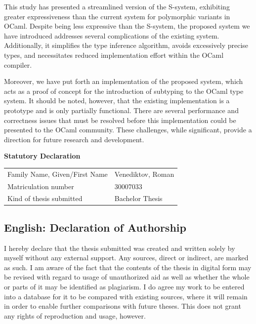 \documentclass[a4paper,11pt,oneside]{article}
\theoremstyle{definition}
\newcommand{\mylastname}{Venediktov}
\newcommand{\myfirstname}{Roman}
\newcommand{\mynumber}{30007033}
\begin{document}
This study has presented a streamlined version of the S-system\cite{Castagna_2016}, exhibiting greater expressiveness than the current system for polymorphic variants in OCaml. Despite being less expressive than the S-system, the proposed system we have introduced addresses several complications of the existing system. Additionally, it simplifies the type inference algorithm, avoids excessively precise types, and necessitates reduced implementation effort within the OCaml compiler.

Moreover, we have put forth an implementation of the proposed system, which acts as a proof of concept for the introduction of subtyping to the OCaml type system. It should be noted, however, that the existing implementation is a prototype and is only partially functional. There are several performance and correctness issues that must be resolved before this implementation could be presented to the OCaml community. These challenges, while significant, provide a direction for future research and development.

\newpage

\printbibliography

\newpage
\thispagestyle{empty}

\begin{center}
  \Large \textbf{Statutory Declaration}
  \vspace*{8mm}
\end{center}

\begin{center}
  \begin{tabular}{|l|p{85mm}|}
    \hline
    Family Name, Given/First Name & \mylastname, \myfirstname \\
    Matriculation number          & \mynumber                 \\
    Kind of thesis submitted      & Bachelor Thesis           \\
    \hline
  \end{tabular}
  \vspace*{8mm}
\end{center}

\subsection*{English: Declaration of Authorship}

I hereby declare that the thesis submitted was created and written
solely by myself without any external support. Any sources, direct
or indirect, are marked as such. I am aware of the fact that the
contents of the thesis in digital form may be revised with regard to
usage of unauthorized aid as well as whether the whole or parts of
it may be identified as plagiarism. I do agree my work to be entered
into a database for it to be compared with existing sources, where
it will remain in order to enable further comparisons with future
theses. This does not grant any rights of reproduction and usage,
however.
\end{document}
